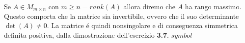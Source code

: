 Se $A \in M_{m \times n}$ con $m \geq n = rank(A)$ allora diremo che $A$ ha rango massimo.
\\
Questo comporta che la matrice sia invertibile, ovvero che il suo determinante $\det(A) \neq 0$. La matrice \'e quindi nonsingolare e di conseguenza simmetrica definita positiva, dalla dimostrazione dell'esercizio \textbf{3.7}. $symbol$
